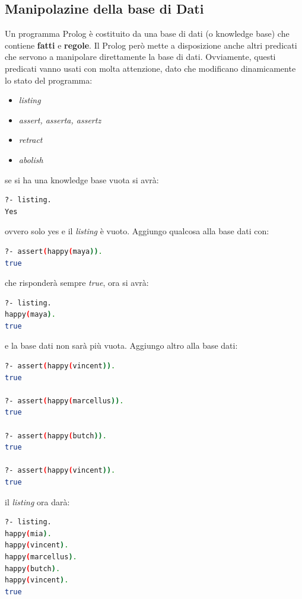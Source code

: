 \documentclass[a4paper,12pt, oneside]{book}
\begin{document}
\subsection{Manipolazine della base di Dati}
Un programma Prolog è costituito da una base di dati (o knowledge base) che contiene \textbf{fatti} e \textbf{regole}. Il Prolog però mette a disposizione anche altri predicati che servono a manipolare direttamente la base di dati. Ovviamente, questi predicati vanno usati con molta attenzione, dato che modificano dinamicamente lo stato del programma:
\begin{itemize}
\item \textit{listing}
\item \textit{assert, asserta, assertz}
\item \textit{retract}
\item \textit{abolish}
\end{itemize}
se si ha una knowledge base vuota si avrà:
\begin{shaded}
\begin{lstlisting}[language=bash]
?- listing.
Yes
\end{lstlisting}
\end{shaded}
ovvero solo yes e il \textit{listing} è vuoto. Aggiungo qualcosa alla base dati con:
\begin{shaded}
\begin{lstlisting}[language=bash]
?- assert(happy(maya)).
true
\end{lstlisting}
\end{shaded}
che risponderà sempre \textit{true}, ora si avrà:
\begin{shaded}
\begin{lstlisting}[language=bash]
?- listing.
happy(maya).
true
\end{lstlisting}
\end{shaded}
e la base dati non sarà più vuota. Aggiungo altro alla base dati:
\begin{shaded}
\begin{lstlisting}[language=bash]
?- assert(happy(vincent)).
true

?- assert(happy(marcellus)).
true

?- assert(happy(butch)).
true

?- assert(happy(vincent)).
true
\end{lstlisting}
\end{shaded}
il \textit{listing} ora darà:
\begin{shaded}
\begin{lstlisting}[language=bash]
?- listing.
happy(mia).
happy(vincent).
happy(marcellus).
happy(butch).
happy(vincent).
true
\end{lstlisting}
\end{shaded}
\end{document}
